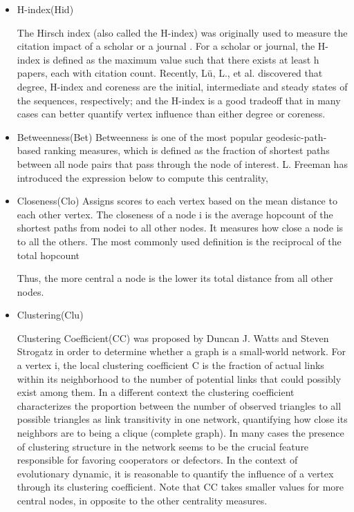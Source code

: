 \documentclass[preprint,12pt,3p]{elsarticle}
\begin{document}
\begin{itemize}
\item H-index(Hid)

The Hirsch index (also called the H-index)\cite{Hirsch-18310} was originally used
to measure the citation impact of a scholar or a journal \cite{BraunGlänzel-18314}.
For a scholar or journal, the H-index is defined as the maximum value such
that there exists at least h papers, each with citation count.
Recently, Lü, L., et al.\cite{LüZhou-18192} discovered that degree, H-index and coreness are the initial, intermediate and steady states of the sequences, respectively;
and the H-index is a good tradeoff that in many cases can better quantify vertex influence than either degree or coreness.

\item Betweenness(Bet)
Betweenness \cite{Anthonisse-18331} is one of the most popular geodesic-path-based ranking measures,
which is defined as the fraction of shortest paths between all node pairs that
pass through the node of interest.
L. Freeman \cite{Freeman-18315} has introduced the expression below to compute this centrality,

\item Closeness(Clo)
Assigns scores to each vertex based on the mean distance to each other vertex.
The closeness \cite{KoschützkiLehmann-18332} of a node i is the average hopcount
of the shortest paths from nodei to all other nodes. It
measures how close a node is to all the others. The most
commonly used definition is the reciprocal of the total
hopcount

Thus, the more central a node is the lower its total distance from all other nodes.

\item Clustering(Clu)

Clustering Coefficient(CC) was proposed by Duncan J. Watts and Steven Strogatz \cite{WattsStrogatz-18333} in order to determine whether a graph is a small-world network.
For a vertex i, the local clustering coefficient C is the fraction of actual links within its neighborhood to the number of potential links that could possibly exist among them.
In a different context the clustering coefficient characterizes the proportion between the number of observed triangles to all possible triangles as link transitivity in one network, quantifying how close its neighbors are to being a clique (complete graph).
In many cases the presence of clustering structure in the network seems to be the crucial feature responsible for favoring cooperators or defectors\cite{SantosPacheco-18280,Gracia-LázaroCuesta-18325,HuangZheng-18221}.
In the context of evolutionary dynamic, it is reasonable to quantify the influence of a vertex through its clustering coefficient.
Note that CC takes smaller values for more central nodes, in opposite to the other centrality measures.


\end{itemize}
\end{document}
